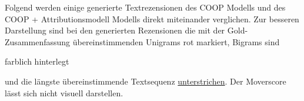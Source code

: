 \newlength{\HeightReference}


\newlength{\Width}%

\newcommand{\ccolorbox}[2][red]%
{%
    \settowidth{\Width}{#2}%
    \setlength{\fboxsep}{1pt}%
    \colorbox{#1}%
    {%
        \raisebox{-\DepthReference}%
        {%
                \parbox[b][\HeightReference+\DepthReference][c]{\Width}{\centering#2}%
        }%
    }%
}



\normalsize


Folgend werden einige generierte Textrezensionen des COOP Modells und des COOP + Attributionsmodell Modells direkt miteinander verglichen.
Zur besseren Darstellung sind bei den generierten Rezensionen die mit der Gold-Zusammenfassung übereinstimmenden Unigrams \textcolor{HighlightColor}{rot} markiert, Bigrams sind \ccolorbox[BackgroundColor]{farblich hinterlegt} und die längste übereinstimmende Textsequenz \underline{unterstrichen}.
Der Moverscore lässt sich nicht visuell darstellen.



\setlength{\fboxsep}{1em}

